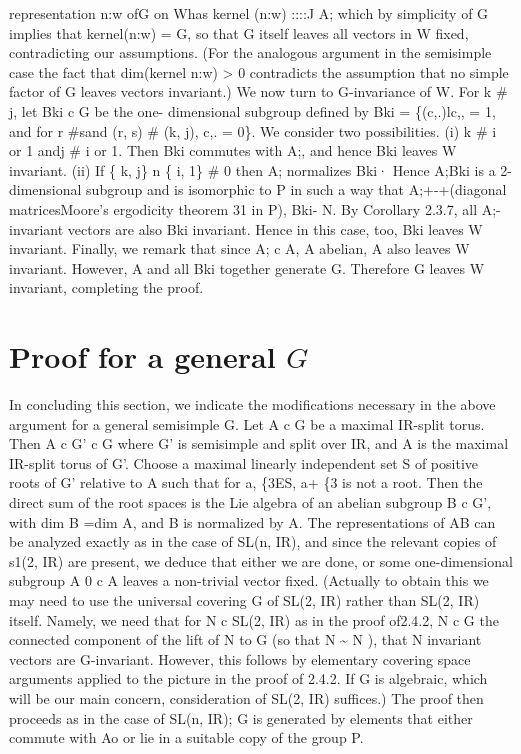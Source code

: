 \documentclass[
]{article}
\theoremstyle{break}
\theoremstyle{plain}
\begin{document}
representation n:w ofG on Whas kernel (n:w) ::::J A; which by simplicity
of G implies that kernel(n:w) = G, so that G itself leaves all vectors
in W fixed, contradicting our assumptions. (For the analogous argument
in the semisimple case the fact that dim(kernel n:w) \textgreater{} 0
contradicts the assumption that no simple factor of G leaves vectors
invariant.) We now turn to G-invariance of W. For k \# j, let Bki c G be
the one- dimensional subgroup defined by Bki = \{(c,.)lc,, = 1, and for
r \#sand (r, s) \# (k, j), c,. = 0\}. We consider two possibilities. (i)
k \# i or 1 andj \# i or 1. Then Bki commutes with A;, and hence Bki
leaves W invariant. (ii) If \{ k, j\} n \{ i, 1\} \# 0 then A;
normalizes Bki· Hence A;Bki is a 2-dimensional subgroup and is
isomorphic to P in such a way that A;+-+(diagonal matricesMoore's
ergodicity theorem 31 in P), Bki- N. By Corollary 2.3.7, all
A;-invariant vectors are also Bki invariant. Hence in this case, too,
Bki leaves W invariant. Finally, we remark that since A; c A, A abelian,
A also leaves W invariant. However, A and all Bki together generate G.
Therefore G leaves W invariant, completing the proof.









\hypertarget{proof-for-a-general-G}{%
\section{Proof for a general \texorpdfstring{$G$}{G}}\label{proof-for-a-general-G}}



 In concluding this section, we indicate the
modifications necessary in the above argument for a general semisimple
G. Let A c G be a maximal IR-split torus. Then A c G' c G where G' is
semisimple and split over IR, and A is the maximal IR-split torus of G'.
Choose a maximal linearly independent set S of positive roots of G'
relative to A such that for a, \{3ES, a+ \{3 is not a root. Then the
direct sum of the root spaces is the Lie algebra of an abelian subgroup
B c G', with dim B =dim A, and B is normalized by A. The representations
of AB can be analyzed exactly as in the case of SL(n, IR), and since the
relevant copies of s1(2, IR) are present, we deduce that either we are
done, or some one-dimensional subgroup A 0 c A leaves a non-trivial
vector fixed. (Actually to obtain this we may need to use the universal
covering G of SL(2, IR) rather than SL(2, IR) itself. Namely, we need
that for N c SL(2, IR) as in the proof of2.4.2, N c G the connected
component of the lift of N to G (so that N \textasciitilde{} N ), that N
invariant vectors are G-invariant. However, this follows by elementary
covering space arguments applied to the picture in the proof of 2.4.2.
If G is algebraic, which will be our main concern, consideration of
SL(2, IR) suffices.) The proof then proceeds as in the case of SL(n,
IR); G is generated by elements that either commute with Ao or lie in a
suitable copy of the group P.
\end{document}
